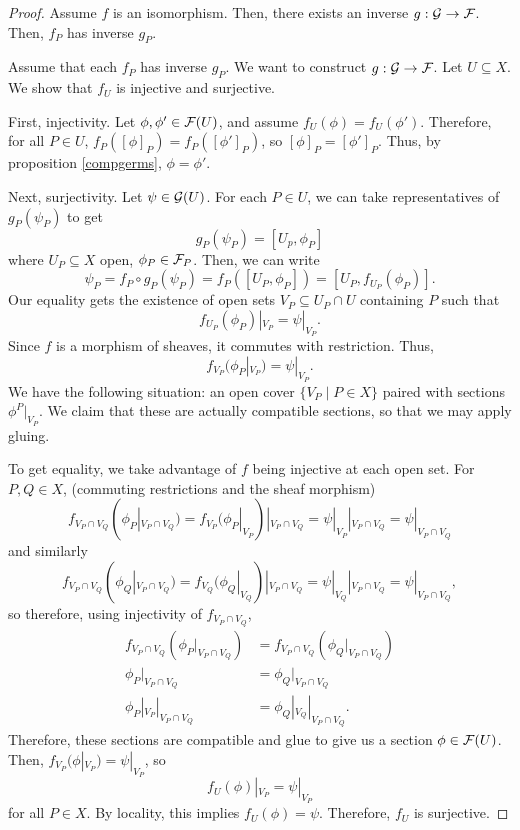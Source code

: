 \documentclass[12pt]{article}
\begin{document}
\begin{proof}
    Assume $f$ is an isomorphism. Then, there exists an inverse $g:\mathcal{G}\to \mathcal{F}$. Then, $f_P$ has inverse $g_P$.
    
    Assume that each $f_P$ has inverse $g_P$. We want to construct $g:\mathcal{G}\to \mathcal{F}$. Let $U\subseteq X$. We show that $f_U$ is injective and surjective.
    
    First, injectivity. Let $\phi,\phi'\in \cF(U)$, and assume $f_U(\phi)=f_U(\phi')$. Therefore, for all $P\in U$, $f_P([\phi]_P)=f_P([\phi']_P)$, so $[\phi]_P=[\phi']_P$. Thus, by proposition \ref{compgerms}, $\phi=\phi'$.
    
    Next, surjectivity. Let $\psi\in \mathcal{G}(U)$. For each $P\in U$, we can take representatives of $g_P(\psi_P)$ to get
    \[g_P(\psi_P) = [U_p, \phi_P]\]
    where $U_P\subseteq X$ open, $\phi_P\in \cF_P$. Then, we can write
    \[\psi_P = f_P\circ g_P(\psi_P) = f_P([U_P, \phi_P]) = [U_P, f_{U_P}(\phi_P)].\]
    Our equality gets the existence of open sets $V_P \subseteq U_P\cap U$ containing $P$ such that
    \[f_{U_P}(\phi_P)|_{V_P} = \psi|_{V_P}.\]
    Since $f$ is a morphism of sheaves, it commutes with restriction. Thus,
    \[f_{V_P}(\phi_P|_{V_P}) = \psi|_{V_P}.\]
    We have the following situation: an open cover $\{V_P \mid P\in X\}$ paired with sections $\phi^P|_{V_P}$. We claim that these are actually compatible sections, so that we may apply gluing.
    
    To get equality, we take advantage of $f$ being injective at each open set. For $P,Q\in X$, (commuting restrictions and the sheaf morphism)
    \[f_{V_P\cap V_Q}(\phi_P|_{V_P\cap V_Q}) = f_{V_P}(\phi_P|_{V_P})|_{V_P\cap V_Q} = \psi|_{V_P}|_{V_P\cap V_Q} = \psi|_{V_P\cap V_Q}\]
    and similarly
    \[f_{V_P\cap V_Q}(\phi_Q|_{V_P\cap V_Q}) = f_{V_Q}(\phi_Q|_{V_Q})|_{V_P\cap V_Q} = \psi|_{V_Q}|_{V_P\cap V_Q} = \psi|_{V_P\cap V_Q},\]
    so therefore, using injectivity of $f_{V_P\cap V_Q}$,
    \begin{align*}
        f_{V_P\cap V_Q}(\phi_P|_{V_P\cap V_Q}) &= f_{V_P\cap V_Q}(\phi_Q|_{V_P\cap V_Q})\\
        \phi_P|_{V_P\cap V_Q} &= \phi_Q|_{V_P\cap V_Q}\\
        \phi_P|_{V_P}|_{V_P\cap V_Q} &= \phi_Q|_{V_Q}|_{V_P\cap V_Q}.
    \end{align*}
    Therefore, these sections are compatible and glue to give us a section $\phi\in \cF(U)$. Then, $f_{V_P}(\phi|_{V_P}) = \psi|_{V_P}$, so
    \[f_U(\phi)|_{V_P} = \psi|_{V_P}\]
    for all $P\in X$. By locality, this implies $f_U(\phi) = \psi$. Therefore, $f_U$ is surjective.
    

\end{proof}
\end{document}
